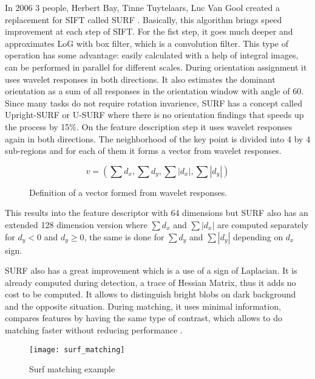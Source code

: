 \documentclass[../../../../main]{subfiles}
\begin{document}
In 2006 3 people, Herbert Bay, Tinne Tuytelaars, Luc Van Gool created a replacement for \ac{SIFT} called \ac{SURF} \cite{surf_bay}. Basically, this algorithm brings speed improvement at each step of \ac{SIFT}. For the fist step, it goes much deeper and approximates \ac{LoG} with box filter, which is a convolution filter. This type of operation has some advantage: easily calculated with a help of integral images, can be performed in parallel for different scales. During orientation assignment it uses wavelet responses in both directions. It also estimates the dominant orientation as a sum of all responses in the orientation window with angle of 60\degree. Since many tasks do not require rotation invarience, \ac{SURF} has a concept called Upright-SURF or U-SURF where there is no orientation findings that speeds up the process by 15\%. On the feature description step it uses wavelet responses again in both directions. The neighborhood of the key point is divided into 4 by 4 sub-regions and for each of them it forms a vector from wavelet responses.

\begin{figure} [!ht]
  \centering    
    \begin{equation}
        v = (\sum{d_x},\sum{d_y},\sum{|d_x|},\sum{|d_y|})
    \end{equation}
  \caption{Definition of a vector formed from wavelet responses.}
\end{figure}

This results into the feature descriptor with 64 dimensions but \ac{SURF} also has an extended 128 dimension version where $\sum{d_x}$ and $\sum{|d_x|}$ are computed separately for $d_y<0$ and $d_y\geq0$, the same is done for $\sum{d_y}$ and $\sum{|d_y|}$ depending on $d_x$ sign.

\ac{SURF} also has a great improvement which is a use of a sign of Laplacian. It is already computed during detection, a trace of Hessian Matrix, thus it adds no cost to be computed. It allows to distinguish bright blobs on dark background and the opposite situation. During matching, it uses minimal information, compares features by having the same type of contrast, which allows to do matching faster without reducing performance \cite{opencv_docs_surf}.

\begin{figure} [ht]
    \begin{center}
        \texttt{[image: surf\_matching]}
        \caption{Surf matching example}
        \label{fig:Surf_Matching}
    \end{center}
\end{figure}
\end{document}
